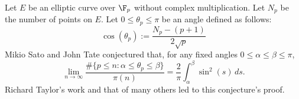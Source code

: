\documentclass [preview, border = 20pt] {standalone}
\begin{document}
\pagecolor{black}
\color{white}
Let $E$ be an elliptic curve over $\F_p$ without complex multiplication. Let $N_p$ be the number of points on $E$. Let $0\le \theta_p\le \pi$ be an angle defined as follows:
\[
 \cos(\theta_p) := \frac{N_p - (p+1)}{2\sqrt p}
\]
Mikio Sato and John Tate conjectured that, for any fixed angles $0\le\alpha\le\beta\le\pi$,
\[
 \lim_{n\to\infty} \frac{\#\{p\le n: \alpha\le\theta_p\le\beta\}}{\pi(n)} = \frac{2}{\pi} \int_\alpha^\beta \sin^2(s)\,ds.
\]
Richard Taylor's work and that of many others led to this conjecture's proof.
\end{document}

